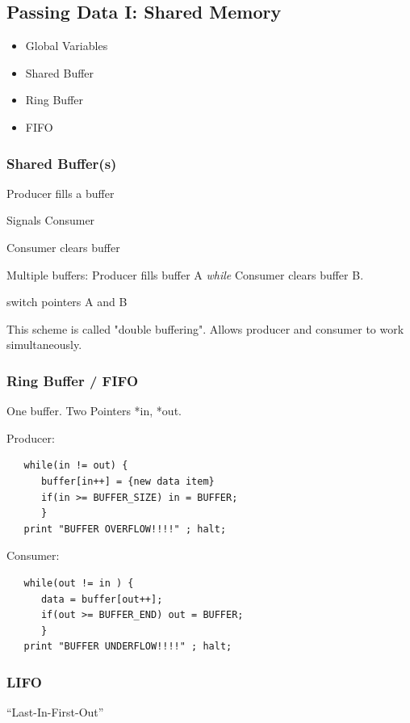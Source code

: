 \documentclass{article}	%
\begin{document}
\subsection{Passing Data I: Shared Memory}

\begin{itemize}
        \item Global Variables
        \item Shared Buffer
        \item Ring Buffer
        \item FIFO
\end{itemize}


\subsubsection{Shared Buffer(s)}
Producer fills a buffer

Signals Consumer

Consumer clears buffer

Multiple buffers:  Producer fills buffer A
{\it while} Consumer clears buffer B.

switch pointers A and B

This scheme is called "double buffering".  Allows producer and
consumer to work simultaneously.

\subsubsection{Ring Buffer / FIFO}

One buffer.    Two Pointers *in, *out.

Producer:
\begin{verbatim}
   while(in != out) {
      buffer[in++] = {new data item}
      if(in >= BUFFER_SIZE) in = BUFFER;
      }
   print "BUFFER OVERFLOW!!!!" ; halt;
\end{verbatim}
Consumer:
\begin{verbatim}
   while(out != in ) {
      data = buffer[out++];
      if(out >= BUFFER_END) out = BUFFER;
      }
   print "BUFFER UNDERFLOW!!!!" ; halt;
\end{verbatim}



\subsubsection{LIFO}
``Last-In-First-Out''
\end{document}
